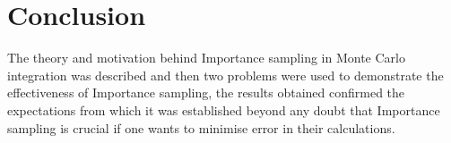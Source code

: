 \documentclass[a4paper,12pt]{article}
\begin{document}
    \section*{Conclusion}
    The theory and motivation behind Importance sampling in Monte Carlo integration was described and then two problems were used to demonstrate the effectiveness of Importance sampling, the results obtained confirmed the expectations from which it was established beyond any doubt that Importance sampling is crucial if one wants to minimise error in their calculations.
\end{document}
